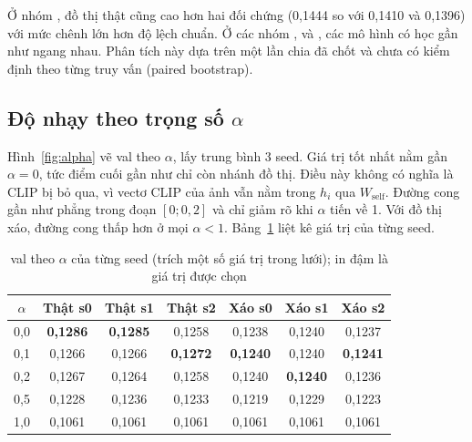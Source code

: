 Ở nhóm , đồ thị thật cũng cao hơn hai đối chứng (0,1444 so với 0,1410 và 0,1396) với mức chênh lớn hơn độ lệch chuẩn. Ở các nhóm ,  và , các mô hình có học gần như ngang nhau. Phân tích này dựa trên một lần chia đã chốt và chưa có kiểm định theo từng truy vấn (paired bootstrap).

\subsection{Độ nhạy theo trọng số $\alpha$}
Hình~\ref{fig:alpha} vẽ \mrr{} val theo $\alpha$, lấy trung bình 3 seed. Giá trị tốt nhất nằm gần $\alpha = 0$, tức điểm cuối gần như chỉ còn nhánh đồ thị. Điều này không có nghĩa là CLIP bị bỏ qua, vì vectơ CLIP của ảnh vẫn nằm trong $h_i$ qua $W_{\text{self}}$. Đường cong gần như phẳng trong đoạn $[0; 0,2]$ và chỉ giảm rõ khi $\alpha$ tiến về 1. Với đồ thị xáo, đường cong thấp hơn ở mọi $\alpha < 1$. Bảng~\ref{tab:alpha} liệt kê giá trị của từng seed.

\begin{table}[t]
\centering
\caption{\mrr{} val theo $\alpha$ của từng seed (trích một số giá trị trong lưới); in đậm là giá trị được chọn}
\label{tab:alpha}
\scriptsize
\setlength{\tabcolsep}{2.5pt}
\begin{tabular}{@{}c c c c c c c@{}}
\toprule
$\alpha$ & Thật s0 & Thật s1 & Thật s2 & Xáo s0 & Xáo s1 & Xáo s2 \\
\midrule
0,0 & \textbf{0,1286} & \textbf{0,1285} & 0,1258 & 0,1238 & 0,1240 & 0,1237 \\
0,1 & 0,1266 & 0,1266 & \textbf{0,1272} & \textbf{0,1240} & 0,1240 & \textbf{0,1241} \\
0,2 & 0,1267 & 0,1264 & 0,1258 & 0,1240 & \textbf{0,1240} & 0,1236 \\
0,5 & 0,1228 & 0,1236 & 0,1233 & 0,1219 & 0,1229 & 0,1223 \\
1,0 & 0,1061 & 0,1061 & 0,1061 & 0,1061 & 0,1061 & 0,1061 \\
\bottomrule
\end{tabular}
\end{table}


